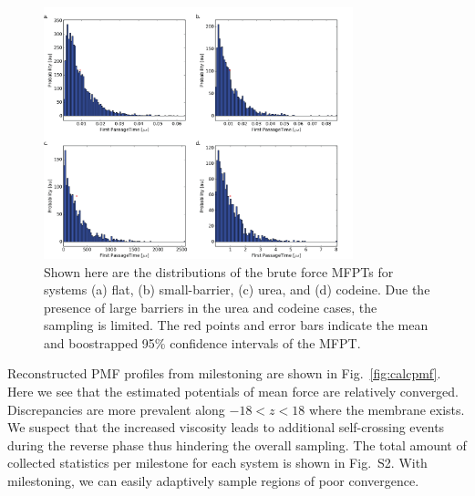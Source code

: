     \begin{figure}[htbp]
    \begin{center}
        \includegraphics[width=0.8\textwidth]{Figures/mfptdist}
        \caption{Shown here are the distributions of the brute force MFPTs for systems (a) flat, (b) small-barrier, (c) urea, and (d) codeine. Due the presence of large barriers in the urea and codeine cases, the sampling is limited. The red points and error bars indicate the mean and boostrapped 95\% confidence intervals of the MFPT.}
        \label{fig:mfpts}
    \end{center}
    \end{figure}

    \par Reconstructed PMF profiles from milestoning are shown in Fig.~\ref{fig:calcpmf}. Here we see that the estimated potentials of mean force are relatively converged. Discrepancies are more prevalent along $-18<z<18$ where the membrane exists. We suspect that the increased viscosity leads to additional self-crossing events during the reverse phase thus hindering the overall sampling. The total amount of collected statistics per milestone for each system is shown in Fig.~S2. With milestoning, we can easily adaptively sample regions of poor convergence.


